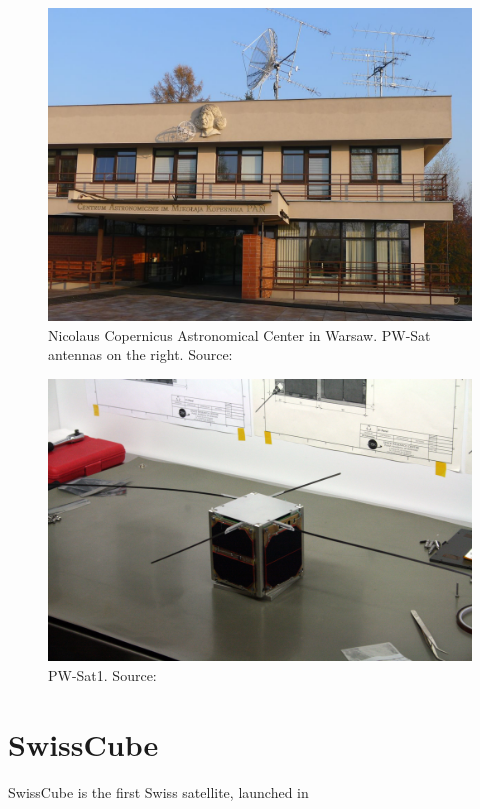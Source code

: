 \begin{minipage}{\linewidth}
    \centering
    \begin{minipage}{0.45\linewidth}
        \begin{figure}[H]
            \centering
            \includegraphics[width=0.32\paperwidth]{img/1/camk_pic.jpg}
            \caption{Nicolaus Copernicus Astronomical Center in Warsaw. PW-Sat antennas on the right. Source: \cite{camk_pic}}
            \label{CAMK_pic}
        \end{figure}
    \end{minipage}
    \hspace{0.05\linewidth}
    \begin{minipage}{0.45\linewidth}
        \begin{figure}[H]
            \centering
            \includegraphics[width=0.32\paperwidth]{img/1/pw-sat1.jpg}
            \caption{PW-Sat1. Source: \cite{pwsat1_pic}}
            \label{PW-Sat1_pic}
        \end{figure}
    \end{minipage}
\end{minipage}

\section{SwissCube}
SwissCube is the first Swiss satellite, launched in

